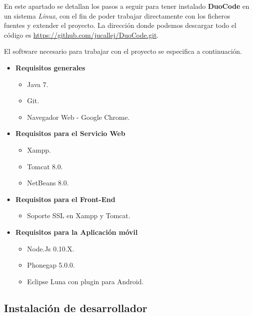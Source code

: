 En este apartado se detallan los pasos a seguir para tener instalado \textbf{DuoCode} en un sistema \textit{Linux}, con el fin de poder trabajar directamente con los ficheros fuentes y extender el proyecto. La dirección donde podemos descargar todo el código es \url{https://github.com/jucallej/DuoCode.git}.

El software necesario para trabajar con el proyecto se especifica a continuación.

\begin{itemize}
\item \textbf{Requisitos generales}
\begin{itemize}
\item Java 7.
\item Git.
\item Navegador Web - Google Chrome.
\end{itemize}
\end{itemize}
\begin{itemize}
\item \textbf{Requisitos para el Servicio Web}
\begin{itemize}
\item Xampp.
\item Tomcat 8.0.
\item NetBeans 8.0.
\end{itemize}
\end{itemize}
\begin{itemize}
\item \textbf{Requisitos para el Front-End}

\begin{itemize}
\item Soporte SSL en Xampp y Tomcat.
\end{itemize}
\end{itemize}
\begin{itemize}
\item \textbf{Requisitos para la Aplicación móvil}
\begin{itemize}
\item Node.Js 0.10.X.
\item Phonegap 5.0.0.
\item Eclipse Luna con plugin para Android.
\end{itemize}
\end{itemize}

\subsection{Instalación de desarrollador}

